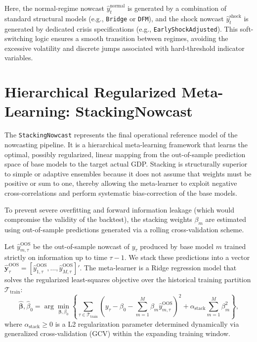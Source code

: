\documentclass[12pt,a4paper]{article}
\begin{document}
Here, the normal-regime nowcast $\hat{y}_{t}^{\text{normal}}$ is generated by a combination of standard structural models (e.g., \texttt{Bridge} or \texttt{DFM}), and the shock nowcast $\hat{y}_{t}^{\text{shock}}$ is generated by dedicated crisis specifications (e.g., \texttt{EarlyShockAdjusted}). This soft-switching logic ensures a smooth transition between regimes, avoiding the excessive volatility and discrete jumps associated with hard-threshold indicator variables.

\section{Hierarchical Regularized Meta-Learning: StackingNowcast}

The \texttt{StackingNowcast} represents the final operational reference model of the nowcasting pipeline. It is a hierarchical meta-learning framework that learns the optimal, possibly regularized, linear mapping from the out-of-sample prediction space of base models to the target actual GDP. Stacking is structurally superior to simple or adaptive ensembles because it does not assume that weights must be positive or sum to one, thereby allowing the meta-learner to exploit negative cross-correlations and perform systematic bias-correction of the base models.

To prevent severe overfitting and forward information leakage (which would compromise the validity of the backtest), the stacking weights $\beta_m$ are estimated using out-of-sample predictions generated via a rolling cross-validation scheme. 

Let $\hat{y}_{m,\tau}^{\text{OOS}}$ be the out-of-sample nowcast of $y_{\tau}$ produced by base model $m$ trained strictly on information up to time $\tau-1$. We stack these predictions into a vector $\hat{\mathbf{y}}_{\tau}^{\text{OOS}} = \left[ \hat{y}_{1,\tau}^{\text{OOS}}, \dots, \hat{y}_{M,\tau}^{\text{OOS}} \right]'$. The meta-learner is a Ridge regression model that solves the regularized least-squares objective over the historical training partition $\mathcal{T}_{\text{train}}$:
\begin{equation}
    \hat{\bm{\beta}}, \hat{\beta}_0 = \arg\min_{\bm{\beta}, \beta_0} \left\{ \sum_{\tau \in \mathcal{T}_{\text{train}}} \left( y_{\tau} - \beta_0 - \sum_{m=1}^{M} \beta_m \hat{y}_{m,\tau}^{\text{OOS}} \right)^2 + \alpha_{\text{stack}} \sum_{m=1}^{M} \beta_m^2 \right\},
\end{equation}
where $\alpha_{\text{stack}} \geq 0$ is a L2 regularization parameter determined dynamically via generalized cross-validation (GCV) within the expanding training window. 
\end{document}

